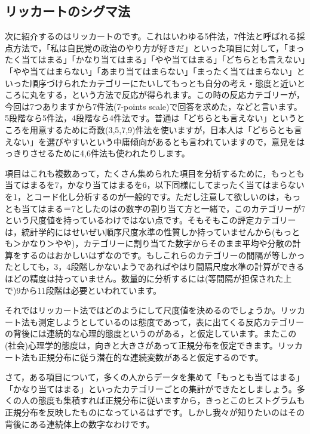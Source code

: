 \documentclass{ltjsbook}
\begin{document}
\subsection{リッカートのシグマ法}
\label{LikertScale}
次に紹介するのはリッカートのです\parencite{likert1932technique}。これはいわゆる5件法，7件法と呼ばれる採点方法で，「私は自民党の政治のやり方が好きだ」といった項目に対して，「まったく当てはまる」「かなり当てはまる」「やや当てはまる」「どちらとも言えない」「やや当てはまらない」「あまり当てはまらない」「まったく当てはまらない」といった順序づけられたカテゴリーにたいしてもっとも自分の考え・態度と近いところに丸をする，という方法で反応が得られます。この時の反応カテゴリーが，今回は7つありますから7件法(7-points scale)で回答を求めた，などと言います。5段階なら5件法，4段階なら4件法です。普通は「どちらとも言えない」というところを用意するために奇数(3,5,7,9)件法を使いますが，日本人は「どちらとも言えない」を選びやすいという中庸傾向があるとも言われていますので，意見をはっきりさせるために4,6件法も使われたりします。

項目はこれも複数あって，たくさん集められた項目を分析するために，もっとも当てはまるを7，かなり当てはまるを6，以下同様にしてまったく当てはまらないを1，とコード化し分析するのが一般的です。ただし注意して欲しいのは，もっとも当てはまる＝7としたのはの数字の割り当て方と一緒で，このカテゴリーが7という尺度値を持っているわけではない点です。そもそもこの評定カテゴリーは，統計学的にはせいぜい順序尺度水準の性質しか持っていませんから(もっとも＞かなり＞やや)，カテゴリーに割り当てた数字からそのまま平均や分散の計算をするのはおかしいはずなのです。もしこれらのカテゴリーの間隔が等しかったとしても，3，4段階しかないようであればやはり間隔尺度水準の計算ができるほどの精度は持っていません。数量的に分析するには(等間隔が担保された上で)9から11段階は必要といわれています。

それではリッカート法ではどのようにして尺度値を決めるのでしょうか。リッカート法も測定しようとしているのは態度であって，表に出てくる反応カテゴリーの背後には連続的な心理的態度というのがある，と仮定しています。またこの(社会)心理学的態度は，向きと大きさがあって正規分布を仮定できます。リッカート法も正規分布に従う潜在的な連続変数があると仮定するのです。

さて，ある項目について，多くの人からデータを集めて「もっとも当てはまる」「かなり当てはまる」といったカテゴリーごとの集計ができたとしましょう。多くの人の態度も集積すれば正規分布に従いますから，きっとこのヒストグラムも正規分布を反映したものになっているはずです。しかし我々が知りたいのはその背後にある連続体上の数字なわけです。
\end{document}
